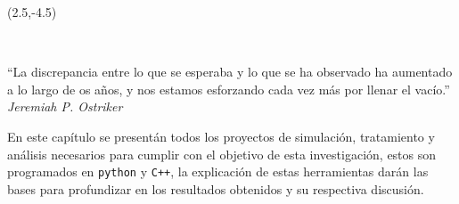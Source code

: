\begin{textblock}{9}(2.5,-4.5)
\begin{flushright}
\setlength{\baselineskip}{15pt}
~

``La discrepancia entre lo que se esperaba y lo que se ha observado ha aumentado a lo largo de os años, y nos estamos esforzando cada vez más por llenar el vacío.''\\[.5cm]
\textit{Jeremiah P. Ostriker}
\end{flushright}
\end{textblock}

 En este capítulo se presentán todos los proyectos de simulación, tratamiento y análisis necesarios para cumplir con el objetivo de esta investigación, estos son programados en \texttt{python} y \texttt{C++}, la explicación de estas herramientas darán las bases para profundizar en los resultados obtenidos y su respectiva discusión.
 

